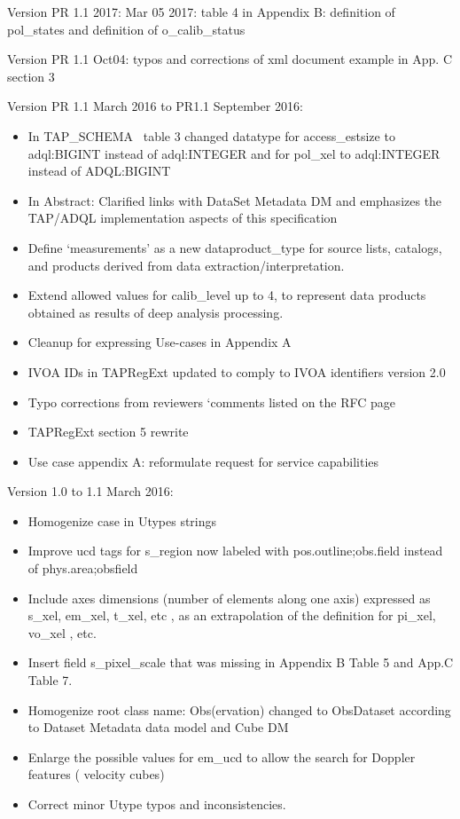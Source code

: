 \documentclass[11pt,a4paper]{ivoa}
\begin{document}
Version PR 1.1 2017: Mar 05 2017: table 4 in Appendix B: definition of pol\_states and definition of o\_calib\_status 

Version PR 1.1 Oct04: typos and corrections of xml document example in App. C section 3 

Version PR 1.1 March 2016 to PR1.1 September 2016: 

\begin{itemize}
\item In TAP\_SCHEMA~ table 3 changed datatype for access\_estsize to adql:BIGINT instead of adql:INTEGER and for
pol\_xel to adql:INTEGER instead of ADQL:BIGINT
\item In Abstract: Clarified links with DataSet Metadata DM and emphasizes the TAP/ADQL implementation aspects of this
specification
\item Define `measurements' as a new dataproduct\_type for source lists, catalogs, and products derived from data
extraction/interpretation.
\item Extend allowed values for calib\_level up to 4, to represent data products obtained as results of deep analysis
processing.
\item Cleanup for expressing Use-cases in Appendix A 
\item IVOA IDs in TAPRegExt updated to comply to IVOA identifiers version 2.0 
\item Typo corrections from reviewers `comments listed on the RFC page
\item TAPRegExt section 5 rewrite 
\item Use case appendix A: reformulate request for service capabilities 
\end{itemize}
Version 1.0 to 1.1 March 2016:

\begin{itemize}
\item Homogenize case in Utypes strings
\item Improve ucd tags for s\_region now labeled with pos.outline;obs.field instead of phys.area;obsfield
\item Include axes dimensions (number of elements along one axis) expressed as s\_xel, em\_xel, t\_xel, etc , as an
extrapolation of the definition for pi\_xel, vo\_xel , etc. 
\item Insert field s\_pixel\_scale that was missing in Appendix B Table 5 and App.C Table 7.
\item Homogenize root class name: Obs(ervation) changed to ObsDataset according to Dataset Metadata data model and Cube
DM
\item Enlarge the possible values for em\_ucd to allow the search for Doppler features ( velocity cubes)
\item Correct minor Utype typos and inconsistencies.
\end{itemize}



\end{document}
